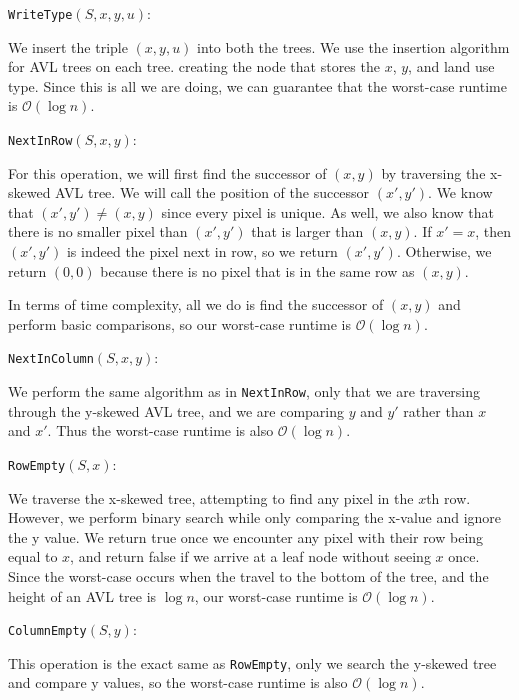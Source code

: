 \documentclass{assignment-263}
\begin{document}
\texttt{WriteType}\((S,x,y, u)\): 

We insert the triple \((x,y,u)\) into both the trees. We use the insertion algorithm for AVL trees on each tree. creating the node that stores the \(x\), \(y\), and land use type. Since this is all we are doing, we can guarantee that the worst-case runtime is \(\mathcal{O}(\log n)\).

\texttt{NextInRow}\((S,x,y)\):

For this operation, we will first find the successor of \((x,y)\) by traversing the x-skewed AVL tree. We will call the position of the successor \((x',y')\). We know that \((x',y') \neq (x,y)\) since every pixel is unique. As well, we also know that there is no smaller pixel than \((x',y')\) that is larger than \((x,y)\). If \(x' = x\), then \((x',y')\) is indeed the pixel next in row, so we return \((x',y')\). Otherwise, we return \((0,0)\) because there is no pixel that is in the same row as \((x,y)\).

In terms of time complexity, all we do is find the successor of \((x,y)\) and perform basic comparisons, so our worst-case runtime is \(\mathcal{O} (\log n)\).

\texttt{NextInColumn}\((S,x,y)\): 

We perform the same algorithm as in \texttt{NextInRow}, only that we are traversing through the y-skewed AVL tree, and we are comparing \(y\) and \(y'\) rather than \(x\) and \(x'\). Thus the worst-case runtime is also \(\mathcal{O} (\log n)\).

\texttt{RowEmpty}\((S,x)\): 

We traverse the x-skewed tree, attempting to find any pixel in the \(x\)th row. However, we perform binary search while only comparing the x-value and ignore the y value. We return true once we encounter any pixel with their row being equal to \(x\), and return false if we arrive at a leaf node without seeing \(x\) once. Since the worst-case occurs when the travel to the bottom of the tree, and the height of an AVL tree is \(\log n\), our worst-case runtime is \(\mathcal{O} (\log n)\).

\texttt{ColumnEmpty}\((S,y)\): 

This operation is the exact same as \texttt{RowEmpty}, only we search the y-skewed tree and compare y values, so the worst-case runtime is also \(\mathcal{O} (\log n)\).

\program
\end{document}
